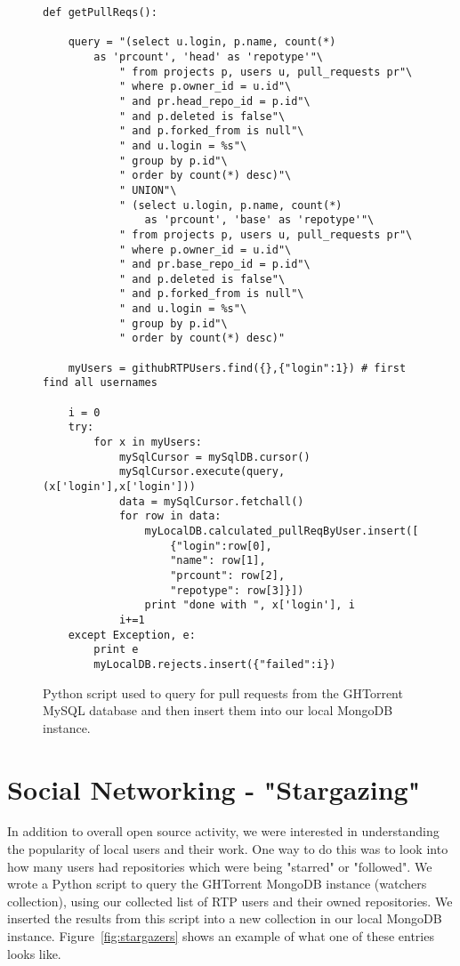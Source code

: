 \begin{figure}
\footnotesize
\begin{lstlisting}
def getPullReqs():

    query = "(select u.login, p.name, count(*) 
    	as 'prcount', 'head' as 'repotype'"\
            " from projects p, users u, pull_requests pr"\
            " where p.owner_id = u.id"\
            " and pr.head_repo_id = p.id"\
            " and p.deleted is false"\
            " and p.forked_from is null"\
            " and u.login = %s"\
            " group by p.id"\
            " order by count(*) desc)"\
            " UNION"\
            " (select u.login, p.name, count(*) 
            	as 'prcount', 'base' as 'repotype'"\
            " from projects p, users u, pull_requests pr"\
            " where p.owner_id = u.id"\
            " and pr.base_repo_id = p.id"\
            " and p.deleted is false"\
            " and p.forked_from is null"\
            " and u.login = %s"\
            " group by p.id"\
            " order by count(*) desc)"

    myUsers = githubRTPUsers.find({},{"login":1}) # first find all usernames

    i = 0
    try:
        for x in myUsers:
            mySqlCursor = mySqlDB.cursor()
            mySqlCursor.execute(query,(x['login'],x['login']))
            data = mySqlCursor.fetchall()
            for row in data:
                myLocalDB.calculated_pullReqByUser.insert([
                    {"login":row[0],
                    "name": row[1],
                    "prcount": row[2],
                    "repotype": row[3]}])
                print "done with ", x['login'], i
            i+=1
    except Exception, e:
        print e
        myLocalDB.rejects.insert({"failed":i})
\end{lstlisting}
\caption{Python script used to query for pull requests from the GHTorrent MySQL database and then insert them into our local MongoDB instance.}
\label{fig:pullrequests}
\end{figure}

\section{Social Networking - "Stargazing"}
\label{sec-stargazing}
In addition to overall open source activity, we were interested in understanding the popularity of local users and their work. One way to do this was to look into how many users had repositories which were being "starred" or "followed". We wrote a Python script to query the GHTorrent MongoDB instance (watchers collection), using our collected list of RTP users and their owned repositories. We inserted the results from this script into a new collection in our local MongoDB instance. Figure~\ref{fig:stargazers} shows an example of what one of these entries looks like. 

